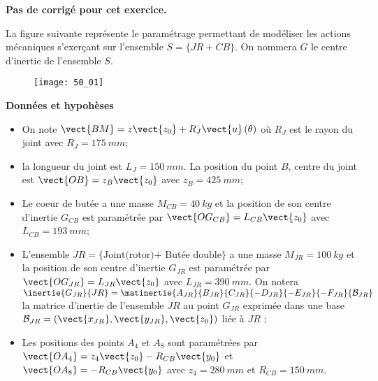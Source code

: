 \normaltrue \difficilefalse \tdifficilefalse
\correctionfalse


\setcounter{numques}{0}
\ifcorrection
\else
\textbf{Pas de corrigé pour cet exercice.}
\fi




\ifprof
\else
La figure suivante représente le paramétrage permettant de modéliser les actions mécaniques
s’exerçant sur l’ensemble $S=\{JR+CB\}$. On nommera $G$ le centre d’inertie de l’ensemble
$S$.


\begin{figure}[H]
\centering
\texttt{[image: 50\_01]}
\end{figure}
\fi

\textbf{Données et hypohèses}

\begin{itemize}
\item On note $\vect{BM}=z\vect{z_0}+R_J\vect{u}\left(\theta\right)$ où $R_J$ est le rayon du joint avec $R_J = \SI{175}{mm}$;
\item la longueur du joint est $L_J = \SI{150}{mm}$. La position du point $B$, centre du joint est $\vect{OB}=z_B\vect{z_0}$ avec $z_B = \SI{425}{mm}$;
\item Le coeur de butée a une masse $M_{CB} = \SI{40}{kg}$ et la position de son centre d’inertie $G_{CB}$ est paramétrée par $\vect{OG_{CB}}= L_{CB}\vect{z_0}$ avec $L_{CB} = \SI{193}{mm}$;
\item L’ensemble $JR=\{\text{Joint(rotor)+ Butée double}\}$ a une masse $M_{JR} = \SI{100}{kg}$ et la
position de son centre d’inertie $G_{JR}$ est paramétrée par $\vect{OG_{JR}}=L_{JR}\vect{z_0}$ avec $L_{JR}=
\SI{390}{mm}$. On notera $\inertie{G_{JR}}{JR} = \matinertie{A_{JR}}{B_{JR}}{C_{JR}}{-D_{JR}}{-E_{JR}}{-F_{JR}}{\mathcal{B}_{JR}}$ la matrice d’inertie de l’ensemble $JR$ au point $G_{JR}$ exprimée dans une base $\mathcal{B}_{JR} = \left(\vect{x_{JR}},\vect{y_{JR}},\vect{z_{0}}\right)$ liée à $JR$ ;
\item Les positions des points $A_4$ et $A_8$ sont paramétrées par $\vect{OA_4} = z_4\vect{z_0}-R_{CB}\vect{y_0}$ et
$\vect{OA_8}=-R_{CB}\vect{y_0}$ avec $z_4 = \SI{280}{mm}$ et $R_{CB}=\SI{150}{mm}$.
\end{itemize}



